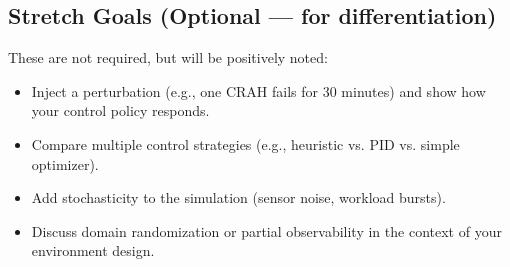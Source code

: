 \documentclass[letterpaper,11pt]{article}
\begin{document}
\subsection{Stretch Goals (Optional — for differentiation)}
These are not required, but will be positively noted:
\begin{itemize}[label=--]
	\item Inject a perturbation (e.g., one CRAH fails for 30 minutes) and show how your control policy
	responds.
	\item Compare multiple control strategies (e.g., heuristic vs. PID vs. simple optimizer).
	\item Add stochasticity to the simulation (sensor noise, workload bursts).
	\item Discuss domain randomization or partial observability in the context of your environment
	design.
\end{itemize}
\end{document}
